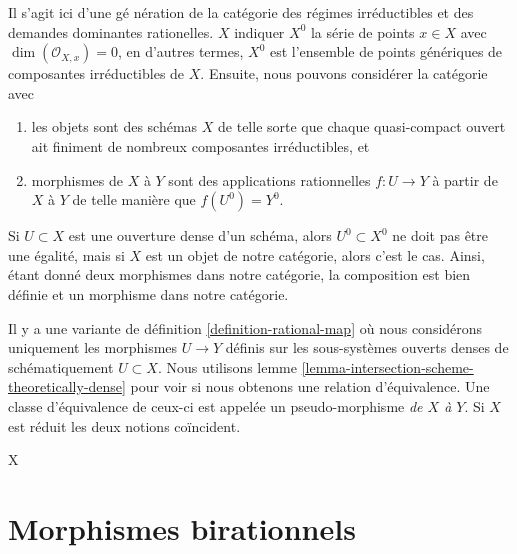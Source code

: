 \begin{remark}

\label{remark-generalize-category}

Il s'agit ici d'une gé nération de la catégorie des régimes irréductibles et des demandes dominantes rationelles. $X$ indiquer $X^0$ la série de points $x \in X$ avec $\dim(\mathcal{O}_{X, x}) = 0$, en d'autres termes,
$X^0$ est l'ensemble de points génériques de composantes irréductibles de $X$. Ensuite, nous pouvons considérer la catégorie avec

\begin{enumerate}

\item les objets sont des schémas $X$ de telle sorte que chaque quasi-compact ouvert ait finiment de nombreux composantes irréductibles, et
\item morphismes de $X$ à $Y$ sont des applications rationnelles $f : U \to Y$
à partir de $X$ à $Y$ de telle manière que $f(U^0) = Y^0$.

\end{enumerate}

Si $U \subset X$ est une ouverture dense d'un schéma, alors
$U^0 \subset X^0$ ne doit pas être une égalité, mais si $X$ est un objet de notre catégorie, alors c'est le cas. Ainsi, étant donné deux morphismes dans notre catégorie, la composition est bien définie et un morphisme dans notre catégorie.

\end{remark}

\begin{remark}

\label{remark-pseudo-morphisms}
Il y a une variante de définition \ref{definition-rational-map} où nous considérons uniquement les morphismes $U \to Y$ définis sur les sous-systèmes ouverts denses de schématiquement $U \subset X$. Nous utilisons lemme \ref{lemma-intersection-scheme-theoretically-dense} pour voir si nous obtenons une relation d'équivalence. Une classe d'équivalence de ceux-ci est appelée un pseudo-morphisme {\it de $X$ à $Y$}. Si $X$ est réduit les deux notions coïncident.
\end{remark}
X






\section{Morphismes birationnels}
\label{section-birational}

